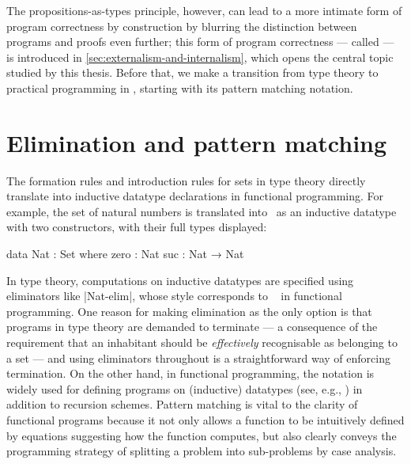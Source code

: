 The propositions-as-types principle, however, can lead to a more intimate form of program correctness by construction by blurring the distinction between programs and proofs even further; this form of program correctness --- called  --- is introduced in \autoref{sec:externalism-and-internalism}, which opens the central topic studied by this thesis.
Before that, we make a transition from type theory to practical programming in \Agda, starting with its pattern matching notation.

\section{Elimination and pattern matching}
\label{sec:pattern-matching}

The formation rules and introduction rules for sets in type theory directly translate into inductive datatype declarations in functional programming.
For example, the set of natural numbers is translated into \Agda\ as an inductive datatype with two constructors, with their full types displayed:
\begin{code}
data Nat : Set where
  zero  : Nat
  suc   : Nat → Nat
\end{code}
In type theory, computations on inductive datatypes are specified using eliminators like |Nat-elim|, whose style corresponds to ~\citep{Meijer-bananas} in functional programming.
One reason for making elimination as the only option is that programs in type theory are demanded to terminate --- a consequence of the requirement that an inhabitant should be \emph{effectively} recognisable as belonging to a set --- and using eliminators throughout is a straightforward way of enforcing termination.
On the other hand, in functional programming, the  notation is widely used for defining programs on (inductive) datatypes (see, e.g., \citet[Section~5]{Hudak-history-of-Haskell}) in addition to recursion schemes.
Pattern matching is vital to the clarity of functional programs because it not only allows a function to be intuitively defined by equations suggesting how the function computes, but also clearly conveys the programming strategy of splitting a problem into sub-problems by case analysis.

